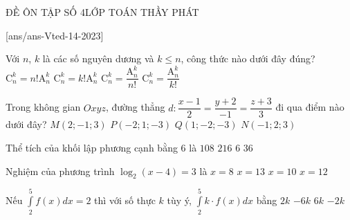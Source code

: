 \begin{name}
	{\tenchude}{ĐỀ ÔN TẬP SỐ 4}{LỚP TOÁN THẦY PHÁT}{\thoigian}
\end{name}
\setcounter{ex}{0}
\setcounter{bt}{0}
[ans/ans-Vted-14-2023]
\begin{ex}%
		Với $n$, $k$ là các số nguyên dương và $k \leq n$, công thức nào dưới đây đúng?
		\choice
		{$\mathrm{C}^k_n = n!\mathrm{A}^k_n$}
		{$\mathrm{C}^k_n = k!\mathrm{A}^k_n$}
		{$\mathrm{C}^k_n = \dfrac{\mathrm{A}^k_n}{n!}$}
		{\True $\mathrm{C}^k_n = \dfrac{\mathrm{A}^k_n}{k!}$}
\end{ex}

\begin{ex}%
	Trong không gian $Oxyz$, đường thẳng $d\colon \dfrac{x-1}{2} = \dfrac{y+2}{-1} = \dfrac{z + 3}{3}$ đi qua điểm nào dưới đây?
	\choice
	{$M(2;-1;3)$}
	{$P(-2;1;-3)$}
	{\True $Q(1;-2;-3)$}
	{$N(-1;2;3)$}
\end{ex}

\begin{ex}%
	Thể tích của khối lập phương cạnh bằng $6$ là
	\choice
	{$108$}
	{\True $216$}
	{$6$}
	{$36$}
\end{ex}

\begin{ex}%
	Nghiệm của phương trình $\log_{2}(x-4) = 3$ là
	\choice
	{$x = 8$}
	{$x = 13$}
	{$x = 10$}
	{\True $x = 12$}
\end{ex}

\begin{ex}%
	Nếu $\displaystyle \int\limits_{2}^{5}f(x)dx = 2$ thì với số thực $k$ tùy ý, $\displaystyle \int\limits_{2}^{5}k\cdot f(x)dx$ bằng
	\choice
	{\True $2k$}
	{$-6k$}
	{$6k$}
	{$-2k$}
\end{ex}

